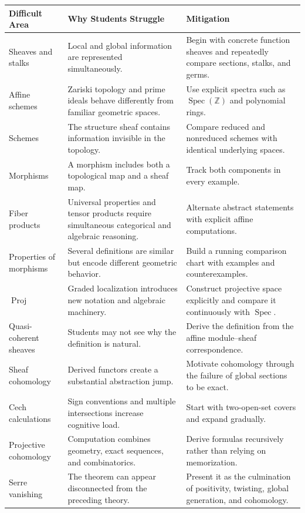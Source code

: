 \documentclass[11pt]{article}
\begin{document}
\begin{longtable}{p{}p{}p{}}
\toprule
\textbf{Difficult Area} & \textbf{Why Students Struggle} & \textbf{Mitigation} \\
\midrule
Sheaves and stalks & Local and global information are represented simultaneously. & Begin with concrete function sheaves and repeatedly compare sections, stalks, and germs. \\
Affine schemes & Zariski topology and prime ideals behave differently from familiar geometric spaces. & Use explicit spectra such as $\operatorname{Spec}(\mathbb Z)$ and polynomial rings. \\
Schemes & The structure sheaf contains information invisible in the topology. & Compare reduced and nonreduced schemes with identical underlying spaces. \\
Morphisms & A morphism includes both a topological map and a sheaf map. & Track both components in every example. \\
Fiber products & Universal properties and tensor products require simultaneous categorical and algebraic reasoning. & Alternate abstract statements with explicit affine computations. \\
Properties of morphisms & Several definitions are similar but encode different geometric behavior. & Build a running comparison chart with examples and counterexamples. \\
$\operatorname{Proj}$ & Graded localization introduces new notation and algebraic machinery. & Construct projective space explicitly and compare it continuously with $\operatorname{Spec}$. \\
Quasi-coherent sheaves & Students may not see why the definition is natural. & Derive the definition from the affine module--sheaf correspondence. \\
Sheaf cohomology & Derived functors create a substantial abstraction jump. & Motivate cohomology through the failure of global sections to be exact. \\
Cech calculations & Sign conventions and multiple intersections increase cognitive load. & Start with two-open-set covers and expand gradually. \\
Projective cohomology & Computation combines geometry, exact sequences, and combinatorics. & Derive formulas recursively rather than relying on memorization. \\
Serre vanishing & The theorem can appear disconnected from the preceding theory. & Present it as the culmination of positivity, twisting, global generation, and cohomology. \\
\bottomrule
\end{longtable}
\end{document}
